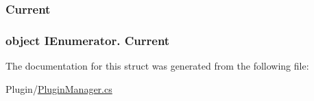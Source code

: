 \subsubsection[{Current}]{ Current\hspace{0.3cm}{\ttfamily [get]}}\label{structOTA_1_1PluginManager_1_1PluginEnumerator_a4b55cd533c1a9e0b90ffd1db3e0c16d5}
\hypertarget{structOTA_1_1PluginManager_1_1PluginEnumerator_a8eccab58e57bd9ad7d0acb94bdd3c754}{}
\subsubsection[{Current}]{\setlength{\rightskip}{0pt plus 5cm}object I\+Enumerator. Current\hspace{0.3cm}{\ttfamily [get]}}\label{structOTA_1_1PluginManager_1_1PluginEnumerator_a8eccab58e57bd9ad7d0acb94bdd3c754}


The documentation for this struct was generated from the following file\+:\begin{DoxyCompactItemize}
\item 
Plugin/\hyperlink{PluginManager_8cs}{Plugin\+Manager.\+cs}\end{DoxyCompactItemize}
